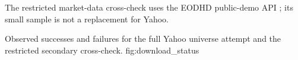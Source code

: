 The restricted market-data cross-check uses the EODHD public-demo API
\citep{eodhd}; its small sample is not a replacement for Yahoo.


  {Observed successes and failures for the full Yahoo universe attempt and the restricted secondary cross-check.}
  {fig:download_status}

